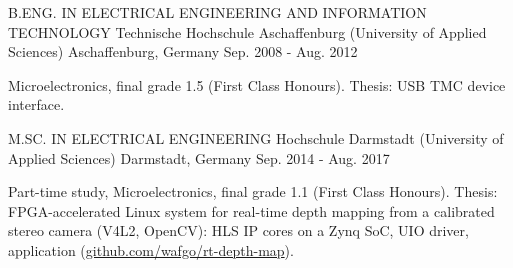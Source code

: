 

\begin{cventries}

  \cventry
    {B.ENG. IN ELECTRICAL ENGINEERING AND INFORMATION TECHNOLOGY} %
    {Technische Hochschule Aschaffenburg (University of Applied Sciences)} %
    {Aschaffenburg, Germany} %
    {Sep. 2008 - Aug. 2012} %
    {
      \begin{cvitems} %
      \item {Microelectronics, final grade 1.5 (First Class Honours). Thesis: USB TMC device interface.}
      \end{cvitems}
    }

    \cventry
    {M.SC. IN ELECTRICAL ENGINEERING} %
    {Hochschule Darmstadt (University of Applied Sciences)} %
    {Darmstadt, Germany} %
    {Sep. 2014 - Aug. 2017} %
    {
      \begin{cvitems} %
      \item {Part-time study, Microelectronics, final grade 1.1 (First Class Honours). Thesis: FPGA-accelerated Linux system for real-time depth mapping from a calibrated stereo camera (V4L2, OpenCV): HLS IP cores on a Zynq SoC, UIO driver, application (\href{https://github.com/wafgo/rt-depth-map}{github.com/wafgo/rt-depth-map}).}
      \end{cvitems}
    }

\end{cventries}
